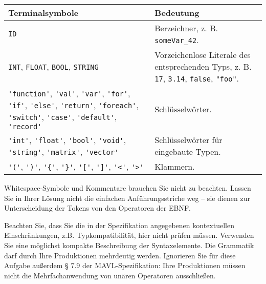 \documentclass[
  ngerman,
  DIV=14
]{scrartcl}
\newcommand{\tablespacing}[1]{\renewcommand{\arraystretch}{#1}}
\begin{document}
\begin{table}[!htbp]\centering\tablespacing{1.3}
\begin{tabular}{@{}p{8cm}p{8cm}@{}}
\toprule
\textbf{Terminalsymbole} & \textbf{Bedeutung}\\
\midrule
\verb|ID| & Berzeichner, z. B. \verb|someVar_42|.\\
\verb|INT|, \verb|FLOAT|, \verb|BOOL|, \verb|STRING| & Vorzeichenlose Literale des entsprechenden Typs, z. B. \verb|17|, \verb|3.14|, \verb|false|, \verb|"foo"|.\\
\verb|'function'|, \verb|'val'|, \verb|'var'|, \verb|'for'|, \verb|'if'|, \verb|'else'|, \verb|'return'|, \verb|'foreach'|, \verb|'switch'|, \verb|'case'|, \verb|'default'|, \verb|'record'| & Schlüsselwörter.\\
\verb|'int'|, \verb|'float'|, \verb|'bool'|, \verb|'void'|, \verb|'string'|, \verb|'matrix'|, \verb|'vector'| & Schlüsselwörter für eingebaute Typen.\\
\verb|'('|, \verb|')'|, \verb|'{'|, \verb|'}'|, \verb|'['|, \verb|']'|, \verb|'<'|, \verb|'>'| & Klammern.\\
\bottomrule
\end{tabular}
\end{table}
\noindent
Whitespace-Symbole und Kommentare brauchen Sie nicht zu beachten. Lassen Sie in Ihrer Lösung nicht die einfachen Anführungsstriche weg -- sie dienen zur Unterscheidung der Tokens von den Operatoren der EBNF.

\begin{hinweis}
Beachten Sie, dass Sie die in der Spezifikation angegebenen kontextuellen Einschränkungen, z.B. Typkompatibilität, hier nicht prüfen müssen. Verwenden Sie eine möglichst kompakte Beschreibung der Syntaxelemente. Die Grammatik darf durch Ihre Produktionen mehrdeutig werden. Ignorieren Sie für diese Aufgabe außerdem § 7.9 der MAVL-Spezifikation: Ihre Produktionen müssen nicht die Mehrfachanwendung von unären Operatoren ausschließen.
\end{hinweis}
\end{document}
